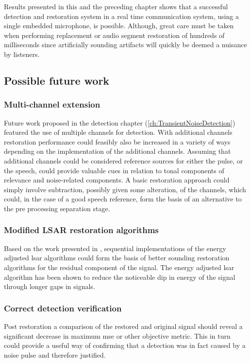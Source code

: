 Results presented in this and the preceding chapter shows that a successful detection and restoration system in a real time communication system, using a single embedded microphone, is possible. Although, great care must be taken when performing replacement or audio segment restoration of hundreds of milliseconds since artificially sounding artifacts will quickly be deemed a nuisance by listeners.

\subsection{Possible future work}
\subsubsection{Multi-channel extension}
Future work proposed in the detection chapter (\ref{ch:TransientNoiseDetection}) featured the use of multiple channels for detection. With additional channels restoration performance could feasibly also be increased in a variety of ways depending on the implementation of the additional channels. Assuming that additional channels could be considered reference sources for either the pulse, or the speech, could provide valuable cues in relation to tonal components of relevance and noise-related components. A basic restoration approach could simply involve subtraction, possibly given some alteration, of the channels, which could, in the case of a good speech reference, form the basis of an alternative to the pre processing separation stage.

\subsubsection{Modified LSAR restoration algorithms}
Based on the work presented in \cite{Esquef2006}, sequential implementations of the energy adjusted \gls{lsar} algorithms could form the basis of better sounding restoration algorithms for the residual component of the signal. The energy adjusted \gls{lsar} algorithm has been shown to reduce the noticeable dip in energy of the signal through longer gaps in signals.

\subsubsection{Correct detection verification}
Post restoration a comparison of the restored and original signal should reveal a significant decrease in maximum \gls{mse} or other objective metric. This in turn could provide a useful way of confirming that a detection was in fact caused by a noise pulse and therefore justified.

